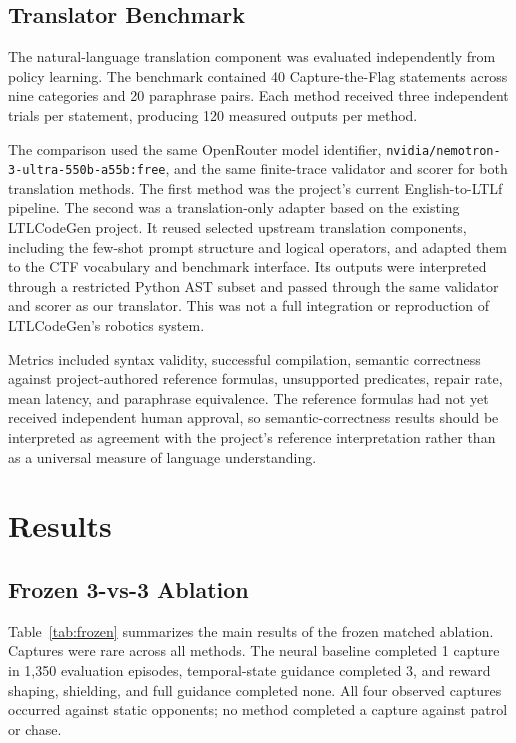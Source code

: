 \documentclass[letterpaper]{article}
\begin{document}
\subsection{Translator Benchmark}

The natural-language translation component was evaluated independently from policy learning. The benchmark contained 40 Capture-the-Flag statements across nine categories and 20 paraphrase pairs. Each method received three independent trials per statement, producing 120 measured outputs per method.

The comparison used the same OpenRouter model identifier, \texttt{nvidia/nemotron-3-ultra-550b-a55b:free}, and the same finite-trace validator and scorer for both translation methods. The first method was the project's current English-to-LTLf pipeline. The second was a translation-only adapter based on the existing LTLCodeGen project. It reused selected upstream translation components, including the few-shot prompt structure and logical operators, and adapted them to the CTF vocabulary and benchmark interface. Its outputs were interpreted through a restricted Python AST subset and passed through the same validator and scorer as our translator. This was not a full integration or reproduction of LTLCodeGen's robotics system.

Metrics included syntax validity, successful compilation, semantic correctness against project-authored reference formulas, unsupported predicates, repair rate, mean latency, and paraphrase equivalence. The reference formulas had not yet received independent human approval, so semantic-correctness results should be interpreted as agreement with the project's reference interpretation rather than as a universal measure of language understanding.

\section{Results}

\subsection{Frozen 3-vs-3 Ablation}

Table~\ref{tab:frozen} summarizes the main results of the frozen matched ablation. Captures were rare across all methods. The neural baseline completed 1 capture in 1,350 evaluation episodes, temporal-state guidance completed 3, and reward shaping, shielding, and full guidance completed none. All four observed captures occurred against static opponents; no method completed a capture against patrol or chase.
\end{document}
